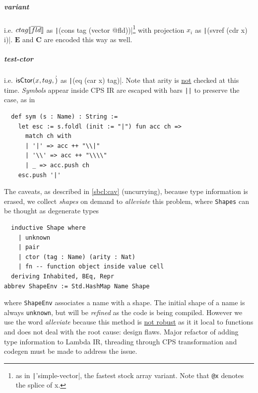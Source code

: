 \documentclass[a4paper, 11pt]{article}
\theoremstyle{remark}\newtheorem*{remark}{Remark}
\theoremstyle{definition}\newtheorem*{definition}{Definition}
\begin{document}
\subparagraph*{variant} i.e. $ctag\llbracket \overline{fld} \rrbracket$ as \texttt|(cons tag (vector @fld))|\footnote{
as in \texttt|'simple-vector|, the fastest stock array variant. Note that \texttt{@x} denotes
the splice of x.
}
with projection $x_i$ as \texttt|(svref (cdr x) i)|. $\mathbf{E}$ and $\mathbf{C}$ are encoded
this way as well.
\subparagraph*{test-ctor} i.e. $\mathsf{isCtor}(x, tag, \dot)$ as \texttt|(eq (car x) tag)|. Note that
arity is \underline{not} checked at this time.
\emph{Symbols} appear inside CPS IR are escaped with bars \texttt{||} to preserve the case, as in
\begin{verbatim}
  def sym (s : Name) : String :=
    let esc := s.foldl (init := "|") fun acc ch =>
      match ch with
      | '|' => acc ++ "\\|"
      | '\\' => acc ++ "\\\\"
      | _ => acc.push ch
    esc.push '|'
\end{verbatim}
The caveats, as described in \autoref{sbcl:cav} (uncurrying), because type information is erased, we
collect \emph{shapes} on demand to \emph{alleviate} this problem, where \texttt{Shapes} can be thought as degenerate types
\begin{verbatim}
  inductive Shape where
    | unknown
    | pair
    | ctor (tag : Name) (arity : Nat)
    | fn -- function object inside value cell
  deriving Inhabited, BEq, Repr
abbrev ShapeEnv := Std.HashMap Name Shape
\end{verbatim}
where \texttt{ShapeEnv} associates a name with a shape.
The initial shape of a name is always \texttt{unknown},
but will be \emph{refined} as the code is being compiled.
However we use the word \emph{alleviate} because this method is \underline{not robust} as it it local to functions and does not deal with the root cause: design flaws.
Major refactor of adding type information to Lambda IR, threading through CPS transformation and
codegen must be made to address the issue.
\end{document}
